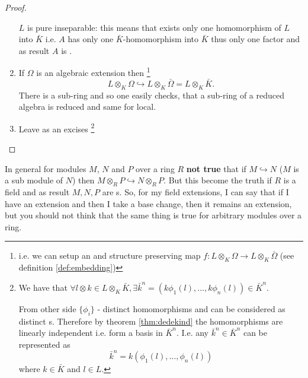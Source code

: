 \begin{theorem}
\begin{proof}
\begin{enumerate}
      $L$ is pure inseparable: this means that exists only one
      homomorphism of $L$ into $\bar{K}$ i.e. $A$ has only one
      $\bar{K}$-homomorphism into $\bar{K}$ thus only one factor and
      as result $A$ is .
    \item If $\Omega$ is an algebraic extension then
      \footnote {
        i.e. we can setup an  and structure
        preserving map $f: L \otimes_K \Omega \to L \otimes_K
        \bar{\Omega}$ (see definition \ref{def:embedding}) 
      }
      \[
      L \otimes_K \Omega \hookrightarrow L \otimes_K \bar{\Omega} =
      L \otimes_K \bar{K}.
      \]
      There is a sub-ring and so one easily checks, that a sub-ring of
      a reduced algebra is reduced and same for local.  
    \item Leave as an excises
      \footnote{
        We have that
        $\forall l \otimes k \in L \otimes_K \bar{K}, \exists
        \bar{k}^n = \left(
        k \phi_1\left(l\right),
        \dots,
        k \phi_n\left(l\right)
        \right) \in \bar{K}^n$.

        From other side $\{\phi_i\}$ - distinct homomorphisms and can
        be considered as distinct s. Therefore
        by theorem \ref{thm:dedekind} the homomorphisms are linearly
        independent i.e. form a basis in $\bar{K}^n$. I.e.
        any $\bar{k}^n \in \bar{K}^n$ can be represented as
        \[
        \bar{k}^n = k
        \left(
        \phi_1\left(l\right),
        \dots,
        \phi_n\left(l\right)
        \right)
        \]
        where $k \in \bar{K}$ and $l \in L$.
      }
    \end{enumerate}
  \end{proof}
\end{theorem}
\begin{remark}
In general for modules $M$, $N$ and $P$ over a ring $R$ \textbf{not true} that
if $M \hookrightarrow N$ ($M$ is a sub module of $N$) then
$M \otimes_R P \hookrightarrow N \otimes_R P$. But this become the
truth if $R$ is a field and as result $M,N,P$ are
s. So, for my field extensions, I can say
that if I have an extension and then I take a base change, then it
remains an extension, but  you should not think that the same thing is
true for arbitrary modules over a ring.  
\end{remark}

